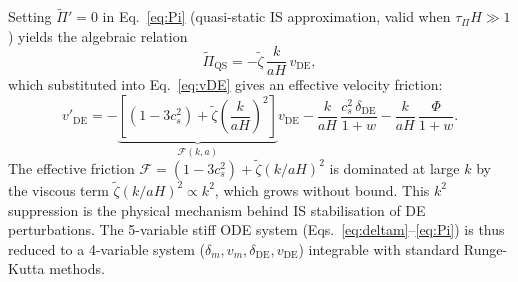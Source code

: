 \documentclass[12pt,a4paper]{article}
\newcommand{\tauPi}{\tau_\Pi}
\newcommand{\ztilde}{\tilde{\zeta}}
\newcommand{\Pitilde}{\tilde{\Pi}}
\begin{document}
Setting $\Pitilde' = 0$ in Eq.~\eqref{eq:Pi} (quasi-static IS approximation,
valid when $\tauPi H \gg 1$) yields the algebraic relation
\begin{equation}
  \Pitilde_{\mathrm{QS}} = -\ztilde\,\frac{k}{aH}\,v_{\mathrm{DE}},
  \label{eq:PiQS}
\end{equation}
which substituted into Eq.~\eqref{eq:vDE} gives an effective velocity friction:
\begin{equation}
  v'_{\mathrm{DE}} = -\underbrace{\!\left[(1-3c^2_s)
    + \ztilde\!\left(\frac{k}{aH}\right)^{\!2}\right]}_{\mathcal{F}(k,a)}\!
    v_{\mathrm{DE}}
    - \frac{k}{aH}\,\frac{c^2_s\,\delta_{\mathrm{DE}}}{1+w}
    - \frac{k}{aH}\,\frac{\Phi}{1+w}.
  \label{eq:vDE_QS}
\end{equation}
The effective friction $\mathcal{F} = (1-3c^2_s) + \ztilde(k/aH)^2$ is dominated
at large $k$ by the viscous term $\ztilde(k/aH)^2 \propto k^2$, which grows without
bound.
This $k^2$ suppression is the physical mechanism behind IS stabilisation of
DE perturbations.
The 5-variable stiff ODE system
(Eqs.~\ref{eq:deltam}--\ref{eq:Pi}) is thus reduced to a 4-variable system
($\delta_m, v_m, \delta_{\mathrm{DE}}, v_{\mathrm{DE}}$) integrable with
standard Runge-Kutta methods.
\end{document}

